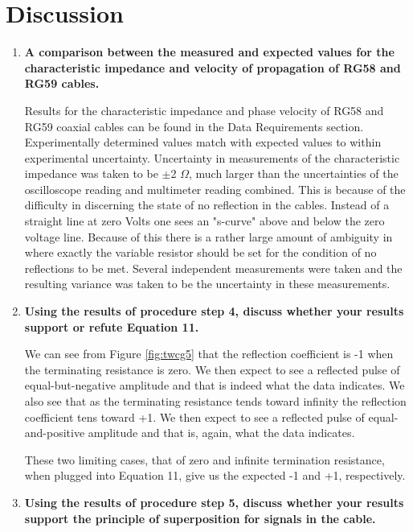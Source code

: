 \section{Discussion}
\begin{enumerate}[resume]

\item {\bf A comparison between the measured and expected values for the characteristic impedance and velocity of propagation of RG58 and RG59 cables.}\newline

Results for the characteristic impedance and phase velocity of RG58 and RG59 coaxial cables can be found in the Data Requirements section. Experimentally determined values match with expected values to within experimental uncertainty. Uncertainty in measurements of the characteristic impedance was taken to be $\pm$2 $\Omega$, much larger than the uncertainties of the oscilloscope reading and multimeter reading combined. This is because of the difficulty in discerning the state of no reflection in the cables. Instead of a straight line at zero Volts one sees an "s-curve" above and below the zero voltage line. Because of this there is a rather large amount of ambiguity in where exactly the variable resistor should be set for the condition of no reflections to be met. Several independent measurements were taken and the resulting variance was taken to be the uncertainty in these measurements.

\item {\bf Using the results of procedure step 4, discuss whether your results support or refute Equation 11. }\newline

We can see from Figure \ref{fig:twcg5} that the reflection coefficient is -1 when the terminating resistance is zero. We then expect to see a reflected pulse of equal-but-negative amplitude and that is indeed what the data indicates. We also see that as the terminating resistance tends toward infinity the reflection coefficient tens toward +1. We then expect to see a reflected pulse of equal-and-positive amplitude and that is, again, what the data indicates. 

These two limiting cases, that of zero and infinite termination resistance, when plugged into Equation 11, give us the expected -1 and +1, respectively.

\item {\bf Using the results of procedure step 5, discuss whether your results support the principle of superposition for signals in the cable.}\newline


\end{enumerate}
